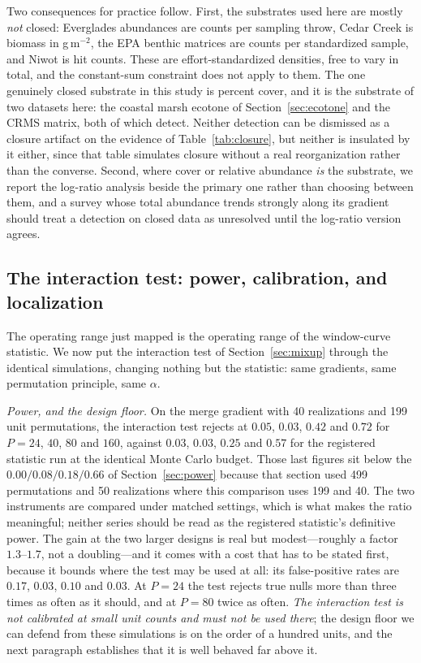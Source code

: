 \documentclass[review,12pt,authoryear]{elsarticle}
\theoremstyle{remark}
\begin{document}
Two consequences for practice follow. First, the substrates used here are mostly
\emph{not} closed: Everglades abundances are counts per sampling throw,
Cedar Creek is biomass in g\,m$^{-2}$, the EPA benthic matrices are counts
per standardized sample, and Niwot is hit counts. These are effort-standardized
densities, free to vary in total, and the constant-sum constraint
does not apply to them. The one genuinely closed substrate in this study is
percent cover, and it is the substrate of two datasets here: the coastal
marsh ecotone of Section~\ref{sec:ecotone} and the CRMS matrix, both of
which detect. Neither detection can be dismissed as a closure artifact on
the evidence of Table~\ref{tab:closure}, but neither is insulated by it
either, since that table simulates closure without a real reorganization
rather than the converse.
Second, where cover or relative abundance \emph{is} the substrate, we report
the log-ratio analysis beside the primary one rather than choosing between
them, and a survey whose total abundance trends strongly along its gradient
should treat a detection on closed data as unresolved until the log-ratio
version agrees.

\subsection{The interaction test: power, calibration, and localization}
\label{sec:mixloc}

The operating range just mapped is the operating range of the window-curve
statistic. We now put the interaction test of Section~\ref{sec:mixup}
through the identical simulations, changing nothing but the statistic:
same gradients, same permutation principle, same $\alpha$.

\emph{Power, and the design floor.} On the merge gradient with 40
realizations and 199 unit permutations, the interaction test rejects at
$0.05$, $0.03$, $0.42$ and $0.72$ for $P = 24$, $40$, $80$ and $160$,
against $0.03$, $0.03$, $0.25$ and $0.57$ for the registered statistic run
at the identical Monte Carlo budget. Those last figures sit below the
$0.00/0.08/0.18/0.66$ of Section~\ref{sec:power} because that section used
499 permutations and 50 realizations where this comparison uses 199 and 40.
The two instruments are compared under matched settings, which is what makes
the ratio meaningful; neither series should be read as the registered
statistic's definitive power. The
gain at the two larger designs is real but modest---roughly a factor
$1.3$--$1.7$, not a doubling---and it comes with a cost that has to be
stated first, because it bounds where the test may be used at all: its
false-positive rates are $0.17$, $0.03$, $0.10$ and $0.03$. At $P = 24$ the
test rejects true nulls more than three times as often as it should, and at
$P = 80$ twice as often. \emph{The interaction test is not calibrated at
small unit counts and must not be used there}; the design floor we can
defend from these simulations is on the order of a hundred units, and the
next paragraph establishes that it is well behaved far above it.
\end{document}
